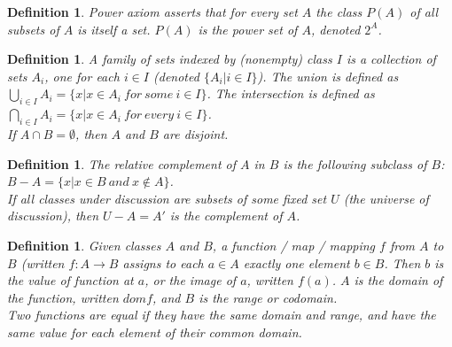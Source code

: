 \documentclass[a4paper,sfsidenotes,openany]{tufte-book}
\theoremstyle{theorem}
\newtheorem{definition}[theorem]{Definition}
\begin{document}
\begin{fullwidth}
\begin{definition}
\textit{{\color{blue} Power axiom}} asserts that for every set $ A $ the class $ P(A) $ of all subsets of $ A $ is itself a set. $ P(A) $ is the \textit{{\color{blue} power set}} of $ A $, denoted $ 2^A $.\\
\end{definition}
\>

\begin{definition}
A \textit{{\color{blue} family of sets}} indexed by (nonempty) class $ I $ is a collection of sets $ A_i $, one for each $ i \in I $ (denoted $\{ A_i | i \in I \}$).\newline
The \textit{{\color{blue} union}} is defined as $ \bigcup\limits_{i \in I}A_{i} = \{ x | x \in A_i \ for \ some \ i \in I \}$.\newline
The \textit{{\color{blue} intersection}} is defined as $ \bigcap\limits_{i \in I}A_{i} = \{ x | x \in A_i \ for \ every \ i \in I \}$.\\
If $ A \cap B = \emptyset $, then $ A $ and $ B $ are disjoint.\\
\end{definition}
\>

\begin{definition}
The \textit{{\color{blue} relative complement}} of $ A $ in $ B $ is the following subclass of $ B $: $ B-A = \{ x | x \in B \ and \ x \notin A \}$. \\
If all classes under discussion are subsets of some fixed set $ U $ (the universe of discussion), then $ U - A = A' $ is the \textit{{\color{blue} complement}} of $ A $.\\
\end{definition}
\>

\begin{definition}
Given classes $ A $ and $ B $, a \textit{{\color{blue} function / map / mapping}} $ f $ from $ A $ to $ B $ (written $ f: A \rightarrow B $ assigns to each $ a \in A $ exactly one element $ b \in B $.\newline
Then $ b $ is the value of function at $ a $, or the \textit{{\color{blue} image}} of $ a $, written $ f(a) $.\newline
$ A $ is the \textit{{\color{blue} domain}} of the function, written $ dom f $, and $ B $ is the \textit{{\color{blue} range}} or \textit{{\color{blue} codomain}}.\\
Two functions are \textit{{\color{blue} equal}} if they have the same domain and range, and have the same value for each element of their common domain.\\
\end{definition}
\>


\end{fullwidth}
\end{document}
